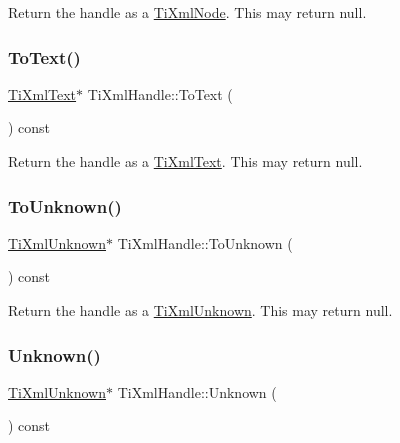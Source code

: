 Return the handle as a \hyperlink{class_ti_xml_node}{Ti\+Xml\+Node}. This may return null. \mbox{\label{class_ti_xml_handle_abde286bce1d5db0d20ec30e573278cdf}} 
\subsubsection{\texorpdfstring{To\+Text()}{ToText()}}
{\footnotesize\ttfamily \hyperlink{class_ti_xml_text}{Ti\+Xml\+Text}$\ast$ Ti\+Xml\+Handle\+::\+To\+Text (\begin{DoxyParamCaption}{ }\end{DoxyParamCaption}) const\hspace{0.3cm}{\ttfamily [inline]}}

Return the handle as a \hyperlink{class_ti_xml_text}{Ti\+Xml\+Text}. This may return null. \mbox{\label{class_ti_xml_handle_a450ec91dac1ded02d72eb918d062ad31}} 
\subsubsection{\texorpdfstring{To\+Unknown()}{ToUnknown()}}
{\footnotesize\ttfamily \hyperlink{class_ti_xml_unknown}{Ti\+Xml\+Unknown}$\ast$ Ti\+Xml\+Handle\+::\+To\+Unknown (\begin{DoxyParamCaption}{ }\end{DoxyParamCaption}) const\hspace{0.3cm}{\ttfamily [inline]}}

Return the handle as a \hyperlink{class_ti_xml_unknown}{Ti\+Xml\+Unknown}. This may return null. \mbox{\label{class_ti_xml_handle_a12b32f098c7daa5facbc04e9618262c5}} 
\subsubsection{\texorpdfstring{Unknown()}{Unknown()}}
{\footnotesize\ttfamily \hyperlink{class_ti_xml_unknown}{Ti\+Xml\+Unknown}$\ast$ Ti\+Xml\+Handle\+::\+Unknown (\begin{DoxyParamCaption}{ }\end{DoxyParamCaption}) const\hspace{0.3cm}{\ttfamily [inline]}}

